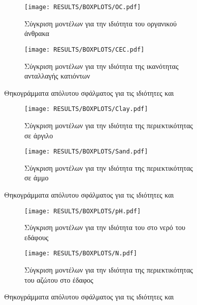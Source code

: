 \begin{figure}[H]
    \begin{subfigure}{0.5\textwidth}
        \texttt{[image: RESULTS/BOXPLOTS/OC.pdf]}
        \caption{Σύγκριση μοντέλων για την ιδιότητα του οργανικού άνθρακα}
        \label{fig:OC_boxplot}
    \end{subfigure}
    \begin{subfigure}{0.5\textwidth}
        \texttt{[image: RESULTS/BOXPLOTS/CEC.pdf]}
        \caption{Σύγκριση μοντέλων για την ιδιότητα της ικανότητας ανταλλαγής κατιόντων}
        \label{fig:CEC_boxplot}
    \end{subfigure}
    \caption{Θηκογράμματα απόλυτου σφάλματος για τις ιδιότητες  και }
    \label{fig:boxpl-OC-CEC}
\end{figure}
\begin{figure}[H]
    \begin{subfigure}{0.5\textwidth}
        \texttt{[image: RESULTS/BOXPLOTS/Clay.pdf]}
        \caption{Σύγκριση μοντέλων για την ιδιότητα της περιεκτικότητας σε άργιλο}
        \label{fig:Clay_boxplot}
    \end{subfigure}
    \begin{subfigure}{0.5\textwidth}
        \texttt{[image: RESULTS/BOXPLOTS/Sand.pdf]}
        \caption{Σύγκριση μοντέλων για την ιδιότητα της περιεκτικότητας σε άμμο}
        \label{fig:Sand_boxplot}
    \end{subfigure}
    \caption{Θηκογράμματα απόλυτου σφάλματος για τις ιδιότητες  και }
    \label{fig:boxpl-Clay-Sand}
\end{figure}
\begin{figure}[H]
    \begin{subfigure}{0.5\textwidth}
        \texttt{[image: RESULTS/BOXPLOTS/pH.pdf]}
        \caption{Σύγκριση μοντέλων για την ιδιότητα του  στο νερό του εδάφους}
        \label{fig:pH_boxplot}
    \end{subfigure}
    \begin{subfigure}{0.5\textwidth}
        \texttt{[image: RESULTS/BOXPLOTS/N.pdf]}
        \caption{Σύγκριση μοντέλων για την ιδιότητα της περιεκτικότητας του αζώτου στο έδαφος}
        \label{fig:N_boxplot}
    \end{subfigure}
    \caption{Θηκογράμματα απόλυτου σφάλματος για τις ιδιότητες  και }
    \label{fig:boxpl-pH-N}
\end{figure}
